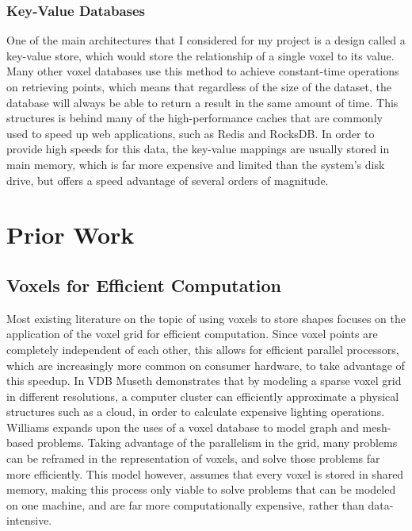 \documentclass[10pt,twocolumn]{article}
\begin{document}
\subsubsection{Key-Value Databases}

One of the main architectures that I considered for my project is a design
called a key-value store\cite{kvdatabase}, which would store the relationship of
a single voxel to its value. Many other voxel databases use this method to
achieve constant-time operations on retrieving points, which means that
regardless of the size of the dataset, the database will always be able to
return a result in the same amount of time. This structures is behind many of
the high-performance caches that are commonly used to speed up web applications,
such as Redis and RocksDB\cite{dong2021rocksdb}. In order to provide high speeds
for this data, the key-value mappings are usually stored in main memory, which
is far more expensive and limited than the system's disk drive, but offers
a speed advantage of several orders of magnitude\cite{latencyKnow}.

\section{Prior Work}

\subsection{Voxels for Efficient Computation}

Most existing literature on the topic of using voxels to store shapes focuses on
the application of the voxel grid for efficient computation. Since voxel points
are completely independent of each other, this allows for efficient parallel
processors, which are increasingly more common on consumer hardware, to take
advantage of this speedup. In VDB\cite{museth2013vdb} Museth demonstrates that
by modeling a sparse voxel grid in different resolutions, a computer cluster can
efficiently approximate a physical structures such as a cloud, in order to
calculate expensive lighting operations.
Williams\cite{williams1992voxel} expands upon the uses of a voxel database to
model graph and mesh-based problems. Taking advantage of the parallelism in the
grid, many problems can be reframed in the representation of voxels, and solve
those problems far more efficiently. This model however, assumes that every
voxel is stored in shared memory, making this process only viable to solve
problems that can be modeled on one machine, and are far more computationally
expensive, rather than data-intensive.
\end{document}
